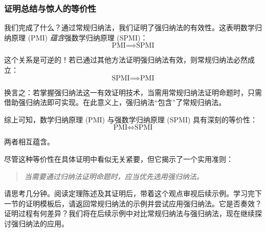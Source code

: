 \subsubsection*{证明总结与惊人的等价性}

我们完成了什么？通过常规归纳法，我们证明了强归纳法的有效性。这表明数学归纳原理 (PMI) \emph{蕴含}强数学归纳原理 (SPMI)：
\[\text{PMI} \implies \text{SPMI}\]

这个关系是可逆的！若已通过其他方法证明强归纳法有效，则常规归纳法必然成立：
\[\text{SPMI} \implies \text{PMI}\]

换言之：若掌握强归纳法这一有效证明技术，当需用常规归纳法证明命题时，只需借助强归纳法即可实现。在此意义上，强归纳法``包含''了常规归纳法。

综上可知，数学归纳原理 (PMI) 与强数学归纳原理 (SPMI) 具有深刻的等价性：
\[\text{PMI} \iff \text{SPMI}\]

两者相互蕴含。

尽管这种等价性在具体证明中看似无关紧要，但它揭示了一个实用准则：
\begin{quotation}
    \emph{当需要通过归纳法证明命题时，应当优先选用强归纳法。}
\end{quotation}

请思考几分钟。阅读定理陈述及其证明后，带着这个观点审视后续示例。学习完下一节的证明模板后，请返回常规归纳法的示例并尝试应用强归纳法。它是否奏效？证明过程有何差异？我们将在后续示例中对比常规归纳法与强归纳法，现在继续探讨强归纳法的应用。

\clearpage